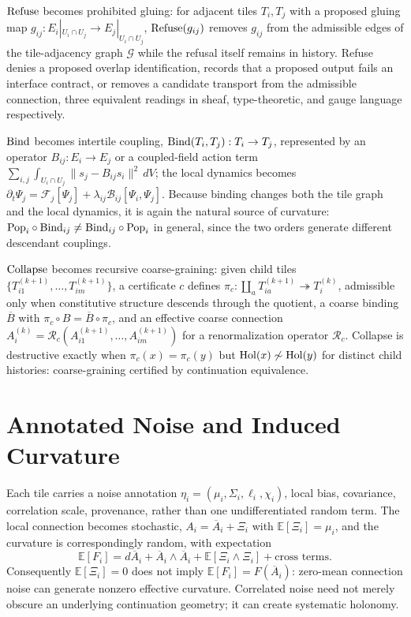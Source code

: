 $\mathrm{Refuse}$ becomes prohibited gluing: for adjacent tiles $T_i, T_j$ with a proposed gluing map $g_{ij} : E_i|_{U_i \cap U_j} \to E_j|_{U_i \cap U_j}$, $\mathrm{Refuse}(g_{ij})$ removes $g_{ij}$ from the admissible edges of the tile-adjacency graph $\mathcal{G}$ while the refusal itself remains in history. Refuse denies a proposed overlap identification, records that a proposed output fails an interface contract, or removes a candidate transport from the admissible connection, three equivalent readings in sheaf, type-theoretic, and gauge language respectively.

$\mathrm{Bind}$ becomes intertile coupling, $\mathrm{Bind}(T_i,T_j) : T_i \to T_j$, represented by an operator $B_{ij} : E_i \to E_j$ or a coupled-field action term $\sum_{i,j} \int_{U_i \cap U_j} \|s_j - B_{ij} s_i\|^2\, dV$; the local dynamics becomes $\partial_t \Psi_j = \mathcal{F}_j[\Psi_j] + \lambda_{ij} \mathcal{B}_{ij}[\Psi_i,\Psi_j]$. Because binding changes both the tile graph and the local dynamics, it is again the natural source of curvature: $\mathrm{Pop}_i \circ \mathrm{Bind}_{ij} \neq \mathrm{Bind}_{ij} \circ \mathrm{Pop}_i$ in general, since the two orders generate different descendant couplings.

$\mathrm{Collapse}$ becomes recursive coarse-graining: given child tiles $\{T_{i1}^{(k+1)}, \ldots, T_{im}^{(k+1)}\}$, a certificate $c$ defines $\pi_c : \coprod_a T_{ia}^{(k+1)} \twoheadrightarrow T_i^{(k)}$, admissible only when constitutive structure descends through the quotient, a coarse binding $\overline{B}$ with $\pi_c \circ B = \overline{B} \circ \pi_c$, and an effective coarse connection $A_i^{(k)} = \mathcal{R}_c(A_{i1}^{(k+1)}, \ldots, A_{im}^{(k+1)})$ for a renormalization operator $\mathcal{R}_c$. Collapse is destructive exactly when $\pi_c(x) = \pi_c(y)$ but $\operatorname{Hol}(x) \not\sim \operatorname{Hol}(y)$ for distinct child histories: coarse-graining certified by continuation equivalence.

\section{Annotated Noise and Induced Curvature}

Each tile carries a noise annotation $\eta_i = (\mu_i, \Sigma_i, \ell_i, \chi_i)$, local bias, covariance, correlation scale, provenance, rather than one undifferentiated random term. The local connection becomes stochastic, $A_i = \overline{A}_i + \Xi_i$ with $\mathbb{E}[\Xi_i] = \mu_i$, and the curvature is correspondingly random, with expectation
\[
\mathbb{E}[F_i] = d\overline{A}_i + \overline{A}_i \wedge \overline{A}_i + \mathbb{E}[\Xi_i \wedge \Xi_i] + \text{cross terms}.
\]
Consequently $\mathbb{E}[\Xi_i] = 0$ does not imply $\mathbb{E}[F_i] = F(\overline{A}_i)$: zero-mean connection noise can generate nonzero effective curvature. Correlated noise need not merely obscure an underlying continuation geometry; it can create systematic holonomy.

